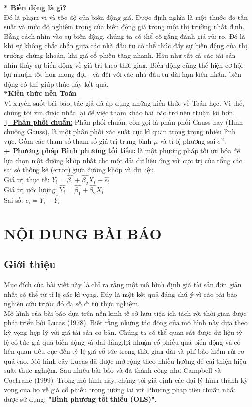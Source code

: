 \documentclass[10pt,a4paper]{article}
\begin{document}
\textbf{* Biến động là gì?}\\
	Đó là phạm vi và tốc độ của biến động giá. Được định nghĩa là một thước đo tần suất và mức độ nghiêm trọng của biến động giá trong một thị trường nhất định. Bằng cách nhìn vào sự biến động, chúng ta có thể cố gắng đánh giá rủi ro. Đó là khi sự không chắc chắn giữa các nhà đầu tư có thể thúc đẩy sự biến động của thị trường chứng khoán, khi giá cổ phiếu tăng nhanh. Hầu như tất cả các tài sản nhìn thấy sự biến động về giá trị theo thời gian. Biến động cũng thể hiện cơ hội lợi nhuận tốt hơn mong đợi - và đối với các nhà đầu tư dài hạn kiên nhẫn, biến động có thể giúp thúc đẩy kết quả.\\
	\textbf{*Kiến thức nền Toán}\\
	Vì xuyên suốt bài báo, tác giả đã áp dụng những kiến thức về Toán học. Vì thế, chúng tôi xin được nhắc lại để việc tham khảo bài báo trở nên thuận lợi hơn.\\
	\textbf{\underline{+ Phân phối chuẩn:}}
	Phân phối chuẩn, còn gọi là phân phối Gauss hay (Hình chuông Gauss), là một phân phối xác suất cực kì quan trọng trong nhiều lĩnh vực. Gồm các tham số  tham số giá trị trung bình $\mu$ và tỉ lệ phương sai $\sigma^2$.\\
	\textbf{\underline{	+ Phương pháp Bình phương tối tiểu:}} là một phương pháp tối ưu hóa để lựa chọn một đường khớp nhất cho một dải dữ liệu ứng với cực trị của tổng các sai số thống kê (error) giữa đường khớp và dữ liệu.\\
	Giá trị thực tế: $Y_i=\hat{\beta_1}+\hat{\beta_2}X_i+\hat{e_i}$\\
	Giá trị ước lượng: $\hat{Y_i}=\hat{\beta_1}+\hat{\beta_2}X_i $\\
	Sai số: $e_i=Y_i-\hat{Y_i}$
	\section{NỘI DUNG BÀI BÁO}
	\subsection{Giới thiệu}
	
	Mục đích của bài viết này là chỉ ra rằng một mô hình định giá tài sản  đơn giản nhất có thể từ tỉ lệ các kì vọng. Đây là một kết quả đáng chú ý vì các bài báo nghiên cứu trước đó đa số đi từ thực nghiệm.\\
	Mô hình của bài báo dựa trên nền kinh tế sở hữu tiện ích tách rời thời gian được phát triển bởi Lucas (1978). Biết rằng những tác động của mô hình này dựa theo kỳ vọng hợp lý với giá tài sản cơ bản. Chúng ta có thể quan sát được  dữ liệu tỷ lệ cổ tức giá quá biến động và dai dẳng,lợi nhuận cổ phiếu quá biến động và có liên quan tiêu cực đến tỷ lệ giá cổ tức trong thời gian dài và phí bảo hiểm rủi ro quá cao.
	Mô hình cây Lucas đã được mở rộng theo nhiều hướng để cải thiện hiệu suất thực nghiệm. Sau nhiều bài báo và đã thành công như Campbell và Cochrane (1999).
	Trong mô hình này, chúng tôi giả định các đại lý hình thành kỳ vọng của họ về giá cổ phiếu trong tương lai với Phương pháp tiêu chuẩn nhất được sử dụng: \textbf{"Bình phương tối thiểu  (OLS)"}.
	
\end{document}
